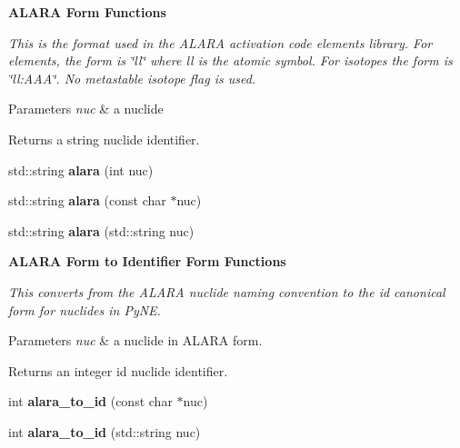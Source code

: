 \begin{Indent}{\bf A\+L\+A\+RA Form Functions}\par
{\em This is the format used in the A\+L\+A\+RA activation code elements library. For elements, the form is \char`\"{}ll\char`\"{} where ll is the atomic symbol. For isotopes the form is \char`\"{}ll\+:\+A\+A\+A\char`\"{}. No metastable isotope flag is used. 
\begin{DoxyParams}{Parameters}
{\em nuc} & a nuclide \\
\hline
\end{DoxyParams}
\begin{DoxyReturn}{Returns}
a string nuclide identifier. 
\end{DoxyReturn}
}\begin{DoxyCompactItemize}
\item 
std\+::string {\bfseries alara} (int nuc)\hypertarget{namespacepyne_1_1nucname_a6180f363d79c5865e19299a12bf6bc7f}{}\label{namespacepyne_1_1nucname_a6180f363d79c5865e19299a12bf6bc7f}

\item 
std\+::string {\bfseries alara} (const char $\ast$nuc)\hypertarget{namespacepyne_1_1nucname_a56aa0b99e1385696757b46bd19e9064e}{}\label{namespacepyne_1_1nucname_a56aa0b99e1385696757b46bd19e9064e}

\item 
std\+::string {\bfseries alara} (std\+::string nuc)\hypertarget{namespacepyne_1_1nucname_a4317364d7f2fd4271d8d6d64a3844473}{}\label{namespacepyne_1_1nucname_a4317364d7f2fd4271d8d6d64a3844473}

\end{DoxyCompactItemize}
\end{Indent}
\begin{Indent}{\bf A\+L\+A\+RA Form to Identifier Form Functions}\par
{\em This converts from the A\+L\+A\+RA nuclide naming convention to the id canonical form for nuclides in Py\+NE. 
\begin{DoxyParams}{Parameters}
{\em nuc} & a nuclide in A\+L\+A\+RA form. \\
\hline
\end{DoxyParams}
\begin{DoxyReturn}{Returns}
an integer id nuclide identifier. 
\end{DoxyReturn}
}\begin{DoxyCompactItemize}
\item 
int {\bfseries alara\+\_\+to\+\_\+id} (const char $\ast$nuc)\hypertarget{namespacepyne_1_1nucname_a18f1a650ff6326ae473a53ecbf3db1ac}{}\label{namespacepyne_1_1nucname_a18f1a650ff6326ae473a53ecbf3db1ac}

\item 
int {\bfseries alara\+\_\+to\+\_\+id} (std\+::string nuc)\hypertarget{namespacepyne_1_1nucname_aa9cbfbadae0f367edadd700a036d0c8a}{}\label{namespacepyne_1_1nucname_aa9cbfbadae0f367edadd700a036d0c8a}

\end{DoxyCompactItemize}
\end{Indent}
